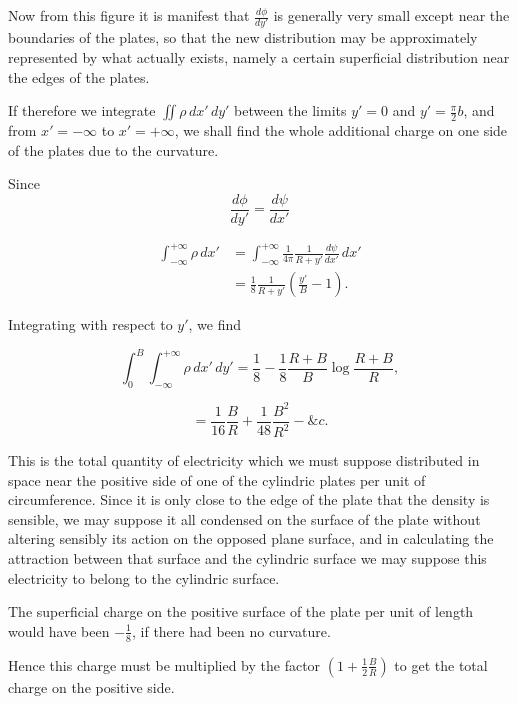 \documentclass[11pt,a4paper]{article}
\begin{document}
Now from this figure it is manifest that $\frac{d\phi}{dy'}$ is
generally very small except near the boundaries of the plates, so that
the new distribution may be approximately represented by what actually
exists, namely a certain superficial distribution near the edges of the
plates.

If therefore we integrate $\iint\rho\,dx'\,dy'$ between the limits
$y'=0$ and $y'=\frac{\pi}{2}b$, and from $x'=-\infty$ to
$x'=+\infty$, we shall find the whole additional charge on one side of
the plates due to the curvature.


Since
\[
\frac{d\phi}{dy'} = \frac{d\psi}{dx'}
\]

\begin{equation}\tag{35}
\begin{aligned}
\int_{-\infty}^{+\infty}\rho\,dx'
&=\int_{-\infty}^{+\infty}
\frac{1}{4\pi}\frac{1}{R+y'}\frac{d\psi}{dx'}\,dx'\\
&=\frac{1}{8}\frac{1}{R+y'}\left(\frac{y'}{B}-1\right).
\end{aligned}
\end{equation}

Integrating with respect to $y'$, we find

\begin{equation}\tag{36}
\int_{0}^{B}\int_{-\infty}^{+\infty}\rho\,dx'\,dy'
=\frac{1}{8}-\frac{1}{8}\frac{R+B}{B}\log\frac{R+B}{R},
\end{equation}

\begin{equation}\tag{37}
=\frac{1}{16}\frac{B}{R}+\frac{1}{48}\frac{B^2}{R^2}-\&c.
\end{equation}

This is the total quantity of electricity which we must suppose
distributed in space near the positive side of one of the cylindric
plates per unit of circumference. Since it is only close to the edge of
the plate that the density is sensible, we may suppose it all condensed
on the surface of the plate without altering sensibly its action on the
opposed plane surface, and in calculating the attraction between that
surface and the cylindric surface we may suppose this electricity to
belong to the cylindric surface.

The superficial charge on the positive surface of the plate per unit of
length would have been $-\frac{1}{8}$, if there had been no curvature.

Hence this charge must be multiplied by the factor
$(1+\frac{1}{2}\frac{B}{R})$ to get the total charge on the positive
side.
\end{document}
